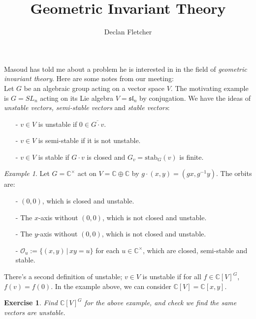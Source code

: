 \documentclass[12pt]{amsart}
\title{Geometric Invariant Theory}
\author{Declan Fletcher}
\date{}
\newcommand{\C}{\mathbb{C}}
\newtheorem*{exercise}{Exercise}
\theoremstyle{remark}
\theoremstyle{remark}
\newtheorem*{example}{Example}
\begin{document}
\maketitle

Masoud has told me about a problem he is interested in in the field of \emph{geometric invariant theory}.
Here are some notes from our meeting: \\

Let $G$ be an algebraic group acting on a vector space $V$.
The motivating example is $G = SL_n$ acting on its Lie algebra $V = \mathfrak{sl}_n$ by conjugation.
We have the ideas of \emph{unstable vectors, semi-stable vectors} and \emph{stable vectors}:
\begin{itemize}
\item[-]
$v \in V$ is unstable if $0 \in \overline{G \cdot v}$.

\item[-]
$v \in V$ is semi-stable if it is not unstable.

\item[-]
$v \in V$ is stable if $G \cdot v$ is closed and $G_v = \mathrm{stab}_G(v)$ is finite.

\end{itemize}

\begin{example}
Let $G = \mathbb{C}^\times$ act on $V = \mathbb{C} \oplus \mathbb{C}$ by $g \cdot (x, y) = (gx, g^{-1} y)$.
The orbits are:
\begin{itemize}
\item[-]
$(0, 0)$, which is closed and unstable.

\item[-]
The $x$-axis without $(0, 0)$, which is not closed and unstable.

\item[-]
The $y$-axis without $(0, 0)$, which is not closed and unstable.

\item[-]
$\mathcal{O}_u := \{(x, y) \, | \, xy = u\}$ for each $u \in \mathbb{C}^\times$, which are closed, semi-stable and stable.
\end{itemize}
\end{example}

There's a second definition of unstable;
$v \in V$ is unstable if for all $f \in \C[V]^G$, $f(v) = f(0)$.
In the example above, we can consider $\mathbb{C}[V] = \mathbb{C}[x, y]$.

\begin{exercise}
Find $\mathbb{C}[V]^G$ for the above example, and check we find the same vectors are unstable.
\end{exercise}
\end{document}
